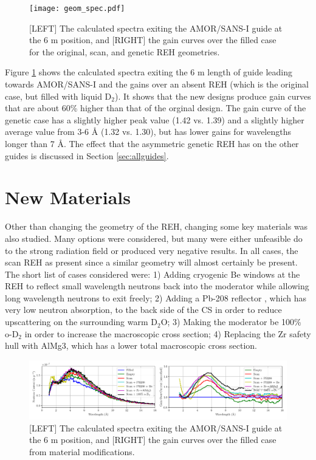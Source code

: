 \documentclass[a4paper]{jpconf}
\begin{document}
\begin{figure}[h!]
\begin{center}
\texttt{[image: geom\_spec.pdf]}
\end{center}
\caption{\label{spec_geom} [LEFT] The calculated spectra exiting the AMOR/SANS-I guide at the 6 m position, and [RIGHT] the gain curves over the filled case for the original, scan, and genetic REH geometries.}
\end{figure}

Figure \ref{spec_geom} shows the calculated spectra exiting the 6 m length of guide leading towards AMOR/SANS-I and the gains over an absent REH (which is the original case, but filled with liquid D$_2$).  It shows that the new designs produce gain curves that are about 60\% higher than that of the orginal design.  The gain curve of the genetic case has a slightly higher peak value (1.42 vs. 1.39) and a slightly higher average value from 3-6 {\AA} (1.32 vs. 1.30), but has lower gains for wavelengths longer than 7 {\AA}.  The effect that the asymmetric genetic REH has on the other guides is discussed in Section \ref{sec:allguides}.

\section{New Materials}

Other than changing the geometry of the REH, changing some key materials was also studied.  Many options were considered, but many were either unfeasible do to the strong radiation field or produced very negative results.  In all cases, the scan REH as present since a similar geometry will almost certainly be present.  The short list of cases considered were: 1) Adding cryogenic Be windows at the REH \cite{Be} to reflect small wavelength neutrons back into the moderator while allowing long wavelength neutrons to exit freely; 2) Adding a Pb-208 reflector \cite{Pb208}, which has very low neutron absorption, to the back side of the CS in order to reduce upscattering on the surrounding warm D$_2$O;  3) Making the moderator be 100\% o-D$_2$ in order to increase the macroscopic cross section; 4) Replacing the Zr safety hull with AlMg3, which has a lower total macroscopic cross section.

\begin{figure}[h!]
\begin{center}
  \includegraphics*[width=\linewidth,trim={0cm 0.4cm 0cm 0.5cm},clip]{all_mat_mods.pdf}
\caption{\label{spec_material}[LEFT] The calculated spectra exiting the AMOR/SANS-I guide at the 6 m position, and [RIGHT] the gain curves over the filled case from material modifications.}
\end{center}
\end{figure}
\end{document}
